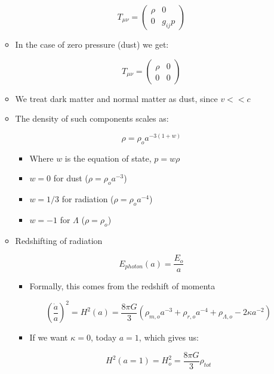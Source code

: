 \begin{itemize}
\begin{itemize}
        $$T_{\mu\nu}=\left( \begin{matrix} \rho & 0\\0 & g_{ij}p \end{matrix} \right)$$

      \item In the case of zero pressure (dust) we get:

        $$T_{\mu\nu}=\left( \begin{matrix} \rho & 0\\0 & 0 \end{matrix} \right)$$

      \item We treat dark matter and normal matter as dust, since $v<<c$

      \item The density of such components scales as:

        $$\rho=\rho_o a^{-3(1+w)}$$

        \begin{itemize}

          \item Where $w$ is the equation of state, $p=w\rho$

          \item $w=0$ for dust ($\rho=\rho_oa^{-3}$)

          \item $w=1/3$ for radiation ($\rho=\rho_oa^{-4}$)

          \item $w=-1$ for $\Lambda$ ($\rho=\rho_o$)

        \end{itemize}

      \item Redshifting of radiation

        $$E_{photon}(a)=\frac{E_o}{a}$$

        \begin{itemize}

          \item Formally, this comes from the redshift of momenta

            $$\left( \frac{\dot{a}}{a} \right)^2=H^2(a)=\frac{8\pi G}{3}\left( \rho_{m,o}a^{-3}+\rho_{r,o}a^{-4}+\rho_{\Lambda,o}-2\kappa a^{-2} \right)$$

          \item If we want $\kappa=0$, today $a=1$, which gives us:

            $$H^2(a=1)=H_o^2=\frac{8\pi G}{3}\rho_{tot}$$


\end{itemize}
\end{itemize}
\end{itemize}
